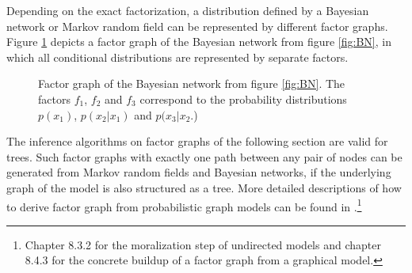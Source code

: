 \documentclass{sigkdd}
\begin{document}
Depending on the exact factorization, a distribution defined by a Bayesian network or Markov random field can be represented by different factor graphs. Figure \ref{fig:FG} depicts a factor graph of the Bayesian network from figure \ref{fig:BN}, in which all conditional distributions are represented by separate factors.

\begin{figure}[h]
	\centering
	\caption{Factor graph of the Bayesian network from figure \ref{fig:BN}. The factors $f_1$, $f_2$ and $f_3$ correspond to the probability distributions $p(x_1)$, $p(x_2|x_1)$ and $p(x_3|x_2$.)}\label{fig:FG}
\end{figure}

The inference algorithms on factor graphs of the following section are valid for trees. Such factor graphs with exactly one path between any pair of nodes can be generated from Markov random fields and Bayesian networks, if the underlying graph of the model is also structured as a tree. More detailed descriptions of how to derive factor graph from probabilistic graph models can be found in \cite{bishop2006prml}.\footnote{Chapter 8.3.2 for the moralization step of undirected models and chapter 8.4.3 for the concrete buildup of a factor graph from a graphical model.}
\end{document}
